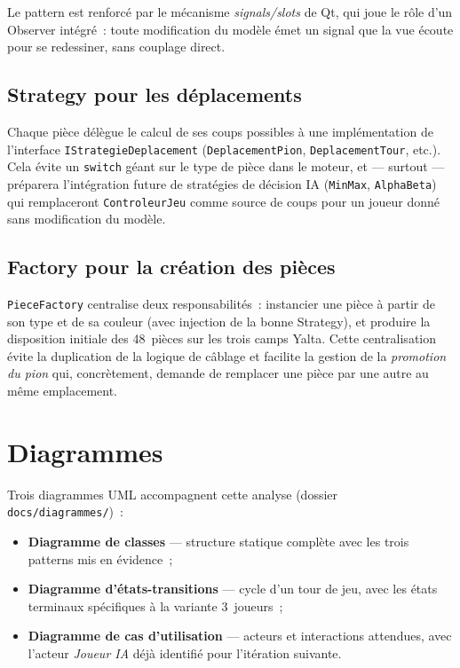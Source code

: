 \documentclass[11pt,a4paper]{article}
\begin{document}
Le pattern est renforcé par le mécanisme \emph{signals/slots} de Qt, qui joue le
rôle d'un Observer intégré~: toute modification du modèle émet un signal que la vue
écoute pour se redessiner, sans couplage direct.

\subsection{Strategy pour les déplacements}

Chaque pièce délègue le calcul de ses coups possibles à une implémentation de
l'interface \texttt{IStrategieDeplacement} (\texttt{DeplacementPion},
\texttt{DeplacementTour}, etc.). Cela évite un \texttt{switch} géant sur le type de
pièce dans le moteur, et --- surtout --- préparera l'intégration future de
stratégies de décision IA (\texttt{MinMax}, \texttt{AlphaBeta}) qui remplaceront
\texttt{ControleurJeu} comme source de coups pour un joueur donné sans modification
du modèle.

\subsection{Factory pour la création des pièces}

\texttt{PieceFactory} centralise deux responsabilités~: instancier une pièce à
partir de son type et de sa couleur (avec injection de la bonne Strategy), et
produire la disposition initiale des 48~pièces sur les trois camps Yalta. Cette
centralisation évite la duplication de la logique de câblage et facilite la
gestion de la \emph{promotion du pion} qui, concrètement, demande de remplacer une
pièce par une autre au même emplacement.

\section{Diagrammes}

Trois diagrammes UML accompagnent cette analyse (dossier
\texttt{docs/diagrammes/})~:
\begin{itemize}
    \item \textbf{Diagramme de classes} --- structure statique complète avec les
    trois patterns mis en évidence~;
    \item \textbf{Diagramme d'états-transitions} --- cycle d'un tour de jeu, avec
    les états terminaux spécifiques à la variante 3~joueurs~;
    \item \textbf{Diagramme de cas d'utilisation} --- acteurs et interactions
    attendues, avec l'acteur \emph{Joueur IA} déjà identifié pour l'itération
    suivante.
\end{itemize}
\end{document}
